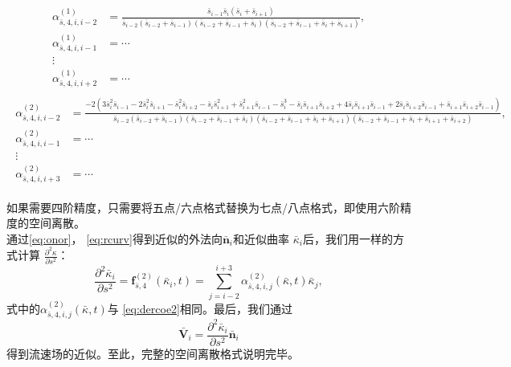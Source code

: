 \documentclass[a4paper,twoside]{ctexart}
\begin{document}
  \begin{footnotesize}
    \begin{eqnarray}
    \begin{aligned}
      \label{eq:dercoe1}      
  \alpha_{\bar{s},4,i,i-2}^{(1)} & =
  \frac{\bar{s}_{i-1}\bar{s}_{i}(\bar{s}_{i}+\bar{s}_{i+1})}{\bar{s}_{i-2}(\bar{s}_{i-2}+\bar{s}_{i-1})(\bar{s}_{i-2}+\bar{s}_{i-1}+\bar{s}_{i})(\bar{s}_{i-2}+\bar{s}_{i-1}+\bar{s}_{i}+\bar{s}_{i+1})},
  \\
  \alpha_{\bar{s},4,i,i-1}^{(1)} &= \cdots\\
  \vdots\\
  \alpha_{\bar{s},4,i,i+2}^{(1)} &= \cdots
\end{aligned}
  \end{eqnarray}
\begin{eqnarray}
\begin{aligned}
      \label{eq:dercoe2}
  \alpha_{\bar{s},4,i,i-2}^{(2)} &=
  \frac{-2(3\bar{s}_{i}^2\bar{s}_{i-1}\! -\!2\bar{s}_{i}^2\bar{s}_{i+1}\! -\!\bar{s}_{i}^2\bar{s}_{i+2}\! -\!\bar{s}_{i}\bar{s}_{i+1}^2\! +\!\bar{s}_{i+1}^2\bar{s}_{i-1}\! -\!\bar{s}_{i}^3\! -\!\bar{s}_{i}\bar{s}_{i+1}\bar{s}_{i+2}\! +\!4\bar{s}_{i}\bar{s}_{i+1}\bar{s}_{i-1}\! +\!2\bar{s}_{i}\bar{s}_{i+2}\bar{s}_{i-1}\! +\!\bar{s}_{i+1}\bar{s}_{i+2}\bar{s}_{i-1})}{\bar{s}_{i-2}(\bar{s}_{i-2}+\bar{s}_{i-1})(\bar{s}_{i-2}+\bar{s}_{i-1}+\bar{s}_{i})(\bar{s}_{i-2}+\bar{s}_{i-1}+\bar{s}_{i}+\bar{s}_{i+1})(\bar{s}_{i-2}+\bar{s}_{i-1}+\bar{s}_{i}+\bar{s}_{i+1}+\bar{s}_{i+2})},
  \\
  \alpha_{\bar{s},4,i,i-1}^{(2)} &= \cdots\\
  \vdots\\
  \alpha_{\bar{s},4,i,i+3}^{(2)} &= \cdots
  \end{aligned}                               
\end{eqnarray}
\end{footnotesize}
\indent 如果需要四阶精度，只需要将五点/六点格式替换为七点/八点格式，即使用六阶精度的空间离散。\\
\indent 通过\eqref{eq:onor}，
  \eqref{eq:rcurv}得到近似的外法向$\bar{\boldsymbol n}_i$和近似曲率
  $\bar{\kappa}_i$后，我们用一样的方式计算
  $\frac{\partial^2\kappa}{\partial s^2}$：
  \begin{equation}
    \label{eq:calderkappa}
    \frac{\partial^2\bar{\kappa}_i}{\partial s^2} =
    \boldsymbol f_{\bar{s},4}^{(2)}(\bar{\kappa}_i,t) = \sum_{j=i-2}^{i+3}\alpha_{\bar{s},4,i,j}^{(2)}(\bar{\kappa},t) \bar{\kappa}_j,
  \end{equation}
  式中的$\alpha_{\bar{s},4,i,j}^{(2)}(\bar{\kappa},t)$与
  \eqref{eq:dercoe2}相同。最后，我们通过
  \begin{equation}
    \label{eq:calv}
    \bar{\boldsymbol V}_i = \frac{\partial^2\bar{\kappa}_i}{\partial s^2}
    \bar{\boldsymbol n}_i
  \end{equation}
  得到流速场的近似。至此，完整的空间离散格式说明完毕。
\end{document}
